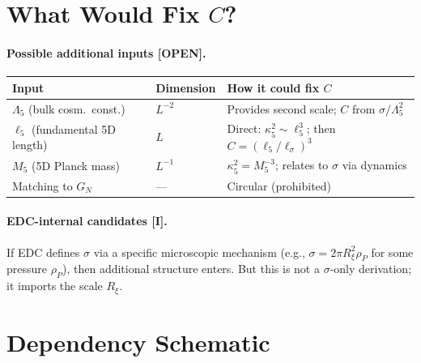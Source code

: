 \documentclass[11pt,a4paper]{article}
\newcommand{\tagI}{\textcolor{green!50!black}{[I]}}
\newcommand{\tagOPEN}{\textcolor{red!70!black}{[OPEN]}}
\begin{document}
\section{What Would Fix $C$?}
\label{sec:fix_C}

\paragraph{Possible additional inputs \tagOPEN{}.}
\begin{center}
\renewcommand{\arraystretch}{1.2}
\begin{tabular}{p{3.5cm}p{2cm}p{6cm}}
\toprule
\textbf{Input} & \textbf{Dimension} & \textbf{How it could fix $C$} \\
\midrule
$\Lambda_5$ (bulk cosm.\ const.) & $L^{-2}$ & Provides second scale; $C$ from $\sigma / \Lambda_5^2$ \\
$\ell_5$ (fundamental 5D length) & $L$ & Direct: $\kappa_5^2 \sim \ell_5^3$; then $C = (\ell_5 / \ell_\sigma)^3$ \\
$M_5$ (5D Planck mass) & $L^{-1}$ & $\kappa_5^2 = M_5^{-3}$; relates to $\sigma$ via dynamics \\
Matching to $G_N$ & --- & Circular (prohibited) \\
\bottomrule
\end{tabular}
\end{center}

\paragraph{EDC-internal candidates \tagI{}.}
If EDC defines $\sigma$ via a specific microscopic mechanism (e.g., $\sigma = 2\pi R_\xi^2 \rho_P$ for some pressure $\rho_P$), then additional structure enters.
But this is not a $\sigma$-only derivation; it imports the scale $R_\xi$.

\section{Dependency Schematic}
\label{sec:schematic}
\end{document}

